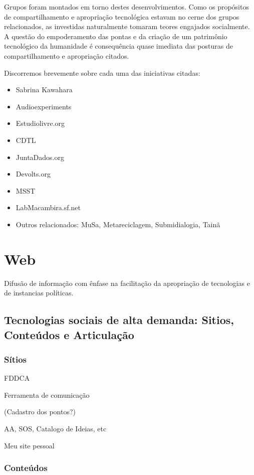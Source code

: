 Grupos foram montados em torno destes desenvolvimentos. Como os
propósitos de compartilhamento e apropriação tecnológica estavam no
cerne dos grupos relacionados, as investidas naturalmente tomaram
teores engajados socialmente. A questão do empoderamento das pontas e
da criação de um patrimônio tecnológico da humanidade é consequência
quase imediata das posturas de compartilhamento e apropriação citados.

Discorremos brevemente sobre cada uma das iniciativas citadas:

\begin{itemize}
    \item Sabrina Kawahara
    \item Audioexperiments
    \item Estudiolivre.org
    \item CDTL
    \item JuntaDados.org
    \item Devolts.org
    \item MSST
    \item LabMacambira.sf.net
    \item Outros relacionados: MuSa, Metareciclagem, Submidialogia, Tainã
\end{itemize}

\section{Web}

  Difusão de informação com ênfase na facilitação
  da apropriação de tecnologias e de instancias políticas.

   \subsection{Tecnologias sociais de alta demanda: Sitios, Conteúdos e Articulação}

      \subsubsection{Sítios}

      FDDCA

      Ferramenta de comunicação

      (Cadastro dos pontos?)

      AA, SOS, Catalogo de Ideias, etc

      Meu site pessoal


      \subsubsection{Conteúdos}


